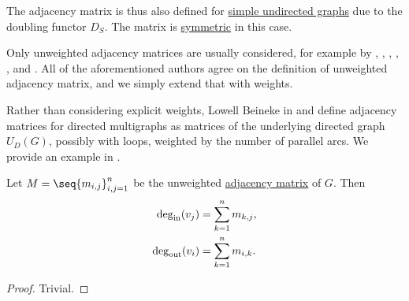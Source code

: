 \begin{comments}
  \item The adjacency matrix is thus also defined for \hyperref[def:undirected_graph]{simple undirected graphs} due to the doubling functor \hyperref[def:graph_functors/simple_doubling]{\( D_S \)}. The matrix is \hyperref[def:transpose_matrix]{symmetric} in this case.

  \item Only unweighted adjacency matrices are usually considered, for example by , , , , ,  and . All of the aforementioned authors agree on the definition of unweighted adjacency matrix, and we simply extend that with weights.

  \item Rather than considering explicit weights, Lowell Beineke in \cite[552]{Rosen1999} and  define adjacency matrices for directed multigraphs as matrices of the underlying directed graph \hyperref[def:graph_functors/directed_forgetful]{\( U_D(G) \)}, possibly with loops, weighted by the number of parallel arcs. We provide an example in .
\end{comments}

\begin{proposition}\label{thm:adjacency_matrix_degree}
  Let \( M = \seq{ m_{i,j} }_{i,j=1}^n \) be the unweighted \hyperref[def:graph_adjacency_matrix]{adjacency matrix} of \( G \). Then
  \begin{align*}
    \deg_{\op{in}}(v_j)  &= \sum_{k=1}^n m_{k,j}, \\
    \deg_{\op{out}}(v_i) &= \sum_{k=1}^n m_{i,k}.
  \end{align*}
\end{proposition}
\begin{proof}
  Trivial.
\end{proof}

